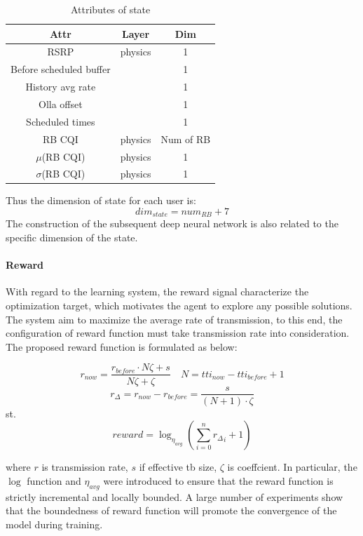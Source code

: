 \documentclass{article}
\begin{document}
\begin{table}[H]
    \centering
    \begin{tabular}{ccc}
    \hline
    Attr                    & Layer   & Dim       \\ \hline
    RSRP                    & physics & 1         \\
    Before scheduled buffer &         & 1         \\
    History avg rate        &         & 1         \\
    Olla offset             &         & 1         \\
    Scheduled times         &         & 1         \\
    RB CQI                  & physics & Num of RB \\
    $ \mu $(RB CQI)         & physics & 1         \\
    $ \sigma $(RB CQI)      & physics & 1         \\ \hline
    \end{tabular}
    \caption{Attributes of state}
\end{table}

Thus the dimension of state for each user is:
$$
dim_{state}=num_{RB}+7
$$
The construction of the subsequent deep neural network is also related to the specific dimension of the state.

\paragraph{Reward}
With regard to the learning system, the reward signal characterize the optimization target, which motivates the agent to explore any possible solutions.
The system aim to maximize the average rate of transmission, to this end, the configuration of reward function must take transmission rate into consideration.
The proposed reward function is formulated as below:

$$
r_{now} = \frac{r_{before}\cdot N\zeta + s}{N\zeta + \zeta} \quad N=tti_{now} - tti_{before} + 1
$$
$$
r_{\Delta }=r_{now}-r_{before}=\frac{s}{(N+1) \cdot \zeta}
$$
st.
$$ 
reward = \log_{\eta_{avg}}(\sum_{i=0}^{n}{r_{\Delta}}_{i}+1) 
$$

where $ r $ is transmission rate, $ s $ if effective tb size, $ \zeta $ is coeffcient.
In particular, the $\log$ function and $\eta_{avg}$ were introduced to ensure that the reward function is strictly incremental and locally bounded. 
A large number of experiments show that the boundedness of reward function will promote the convergence of the model during training.
\end{document}
